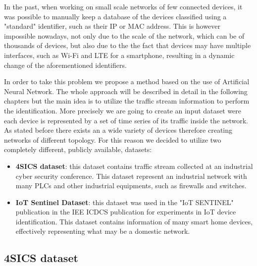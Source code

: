 In the past, when working on small scale networks of few connected devices, it was possible to manually keep a database of the devices classified using a "standard" identifier, such as their IP or MAC address. This is however impossible nowadays, not only due to the scale of the network, which can be of thousands of devices, but also due to the the fact that devices may have multiple interfaces, such as Wi-Fi and LTE for a smartphone, resulting in a dynamic change of the aforementioned identifiers.

In order to take this problem we propose a method based on the use of Artificial Neural Network. The whole approach will be described in detail in the following chapters but the main idea is to utilize the traffic stream information to perform the identification. More precisely we are going to create an input dataset were each device is represented by a set of time series of its traffic inside the network. As stated before there exists an a wide variety of devices therefore creating networks of different topology. For this reason we decided to utilize two completely different, publicly available, datasets:
\begin{itemize}
    \item \textbf{4SICS dataset}: this dataset contains traffic stream collected at an industrial cyber security conference. This dataset represent an industrial network with many PLCs and other industrial equipments, such as firewalls and switches.
    \item \textbf{IoT Sentinel Dataset}: this dataset was used in the "IoT SENTINEL" publication in the IEE ICDCS publication for experiments in IoT device identification. This dataset contains information of many smart home devices, effectively representing what may be a domestic network.
\end{itemize}

\subsection{4SICS dataset}

